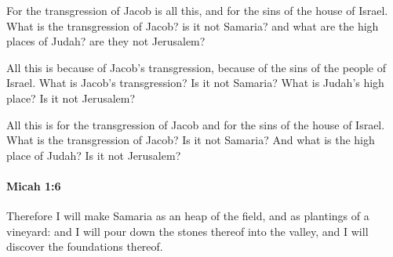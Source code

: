 			\begin{versebox}
					\item[BHS] 
					\item[LXX] 
					\item[ASV] For the transgression of Jacob is all this, and for the sins of the house of Israel. What is the transgression of Jacob? is it not Samaria? and what are the high places of Judah? are they not Jerusalem?
					\item[NIV] All this is because of Jacob’s transgression, because of the sins of the people of Israel. What is Jacob’s transgression? Is it not Samaria? What is Judah’s high place? Is it not Jerusalem?
					\item[NRSV] All this is for the transgression of Jacob and for the sins of the house of Israel. What is the transgression of Jacob? Is it not Samaria? And what is the high place of Judah? Is it not Jerusalem?
			\end{versebox}

		\paragraph{Micah 1:6} %
			\label{MICAH-1-6}

			Therefore I will make Samaria as an heap of the field, and as plantings of a vineyard: and I will pour down the stones thereof into the valley, and I will discover the foundations thereof.

